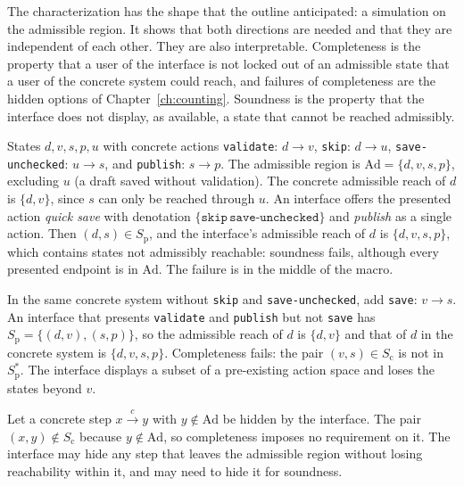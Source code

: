The characterization has the shape that the outline anticipated: a simulation on the admissible region. It shows that both directions are needed and that they are independent of each other. They are also interpretable. Completeness is the property that a user of the interface is not locked out of an admissible state that a user of the concrete system could reach, and failures of completeness are the hidden options of Chapter~\ref{ch:counting}. Soundness is the property that the interface does not display, as available, a state that cannot be reached admissibly.

\begin{example}\label{ex:macro}
States $d,v,s,p,u$ with concrete actions \texttt{validate}: $d\to v$, \texttt{skip}: $d\to u$, \texttt{save-unchecked}: $u\to s$, and \texttt{publish}: $s\to p$. The admissible region is $\mathrm{Ad}=\{d,v,s,p\}$, excluding $u$ (a draft saved without validation). The concrete admissible reach of $d$ is $\{d,v\}$, since $s$ can only be reached through $u$. An interface offers the presented action \textit{quick save} with denotation $\{\texttt{skip}\,\texttt{save-unchecked}\}$ and \textit{publish} as a single action. Then $(d,s)\in S_{\mathrm p}$, and the interface's admissible reach of $d$ is $\{d,v,s,p\}$, which contains states not admissibly reachable: soundness fails, although every presented endpoint is in $\mathrm{Ad}$. The failure is in the middle of the macro.
\end{example}

\begin{example}\label{ex:missing}
In the same concrete system without \texttt{skip} and \texttt{save-unchecked}, add \texttt{save}: $v\to s$. An interface that presents \texttt{validate} and \texttt{publish} but not \texttt{save} has $S_{\mathrm p}=\{(d,v),(s,p)\}$, so the admissible reach of $d$ is $\{d,v\}$ and that of $d$ in the concrete system is $\{d,v,s,p\}$. Completeness fails: the pair $(v,s)\in S_{\mathrm c}$ is not in $S_{\mathrm p}^{*}$. The interface displays a subset of a pre-existing action space and loses the states beyond $v$.
\end{example}

\begin{example}\label{ex:restricted}
Let a concrete step $x\xrightarrow{c}y$ with $y\notin\mathrm{Ad}$ be hidden by the interface. The pair $(x,y)\notin S_{\mathrm c}$ because $y\notin\mathrm{Ad}$, so completeness imposes no requirement on it. The interface may hide any step that leaves the admissible region without losing reachability within it, and may need to hide it for soundness.
\end{example}

